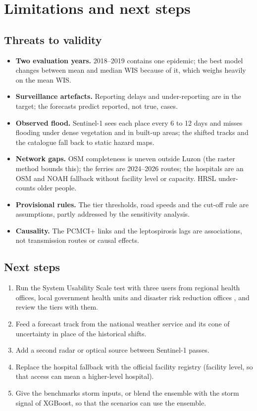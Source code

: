\section{Limitations and next steps}
\label{sec:limits}

\subsection{Threats to validity}

\begin{itemize}
\item \textbf{Two evaluation years.} 2018--2019 contains one epidemic\ifMeanMedianDiffer; the best model changes between mean and median WIS because of it\else, which weighs heavily on the mean WIS\fi.
\item \textbf{Surveillance artefacts.} Reporting delays and under-reporting are in the target; the forecasts predict reported, not true, cases.
\item \textbf{Observed flood.} Sentinel-1 sees each place every 6 to 12 days and misses flooding under dense vegetation and in built-up areas; the shifted tracks and the catalogue fall back to static hazard maps.
\item \textbf{Network gaps.} OSM completeness is uneven outside Luzon (the raster method bounds this); the ferries are 2024--2026 routes; the hospitals are an OSM and NOAH fallback without facility level or capacity.\ifHRSLUnderOld{} HRSL under-counts older people.\fi
\item \textbf{Provisional rules.} The tier thresholds, road speeds and the cut-off rule are assumptions, partly addressed by the sensitivity analysis.
\item \textbf{Causality.} The PCMCI+ links and the leptospirosis lags are associations, not transmission routes or causal effects.
\end{itemize}

\subsection{Next steps}

\begin{enumerate}
\item Run the System Usability Scale test with three users from regional health offices, local government health units and disaster risk reduction offices \parencite{brooke1996}, and review the tiers with them.
\item Feed a forecast track from the national weather service and its cone of uncertainty in place of the historical shifts.
\item Add a second radar or optical source between Sentinel-1 passes.
\item Replace the hospital fallback with the official facility registry (facility level, so that access can mean a higher-level hospital).
\item Give the benchmarks storm inputs, or blend the ensemble with the storm signal of XGBoost, so that the scenarios can use the ensemble.
\end{enumerate}


